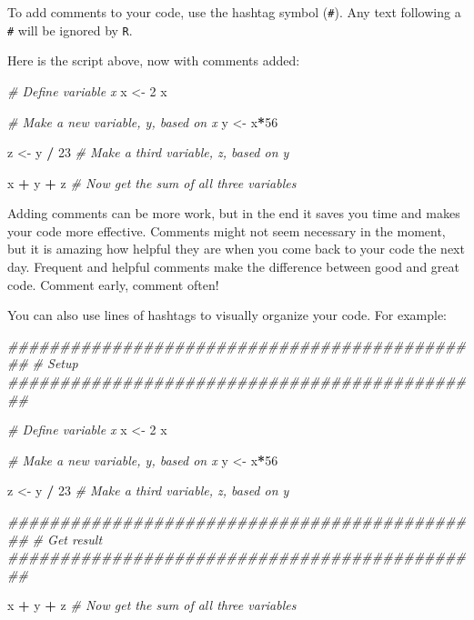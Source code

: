 \documentclass[
]{book}
\newenvironment{Shaded}{\begin{snugshade}}{\end{snugshade}}
\newcommand{\CommentTok}[1]{\textcolor[rgb]{0.56,0.35,0.01}{\textit{#1}}}
\newcommand{\DecValTok}[1]{\textcolor[rgb]{0.00,0.00,0.81}{#1}}
\newcommand{\NormalTok}[1]{#1}
\newcommand{\OperatorTok}[1]{\textcolor[rgb]{0.81,0.36,0.00}{\textbf{#1}}}
\newcommand{\StringTok}[1]{\textcolor[rgb]{0.31,0.60,0.02}{#1}}
\begin{document}
To add comments to your code, use the hashtag symbol (\texttt{\#}). Any text following a \texttt{\#} will be ignored by \texttt{R}.

Here is the script above, now with comments added:

\begin{Shaded}
\begin{Highlighting}[]
\CommentTok{# Define variable x}
\NormalTok{x <-}\StringTok{ }\DecValTok{2} 
\NormalTok{x}

\CommentTok{# Make a new variable, y, based on x}
\NormalTok{y <-}\StringTok{ }\NormalTok{x}\OperatorTok{*}\DecValTok{56}

\NormalTok{z <-}\StringTok{ }\NormalTok{y }\OperatorTok{/}\StringTok{ }\DecValTok{23} \CommentTok{# Make a third variable, z, based on y}
 
\NormalTok{x }\OperatorTok{+}\StringTok{ }\NormalTok{y }\OperatorTok{+}\StringTok{ }\NormalTok{z }\CommentTok{# Now get the sum of all three variables}
\end{Highlighting}
\end{Shaded}

Adding comments can be more work, but in the end it saves you time and makes your code more effective. Comments might not seem necessary in the moment, but it is amazing how helpful they are when you come back to your code the next day. Frequent and helpful comments make the difference between good and great code. Comment early, comment often!

You can also use lines of hashtags to visually organize your code. For example:

\begin{Shaded}
\begin{Highlighting}[]
\CommentTok{##############################################}
\CommentTok{# Setup}
\CommentTok{##############################################}

\CommentTok{# Define variable x}
\NormalTok{x <-}\StringTok{ }\DecValTok{2} 
\NormalTok{x}

\CommentTok{# Make a new variable, y, based on x}
\NormalTok{y <-}\StringTok{ }\NormalTok{x}\OperatorTok{*}\DecValTok{56}

\NormalTok{z <-}\StringTok{ }\NormalTok{y }\OperatorTok{/}\StringTok{ }\DecValTok{23} \CommentTok{# Make a third variable, z, based on y}
 

\CommentTok{##############################################}
\CommentTok{# Get result}
\CommentTok{##############################################}

\NormalTok{x }\OperatorTok{+}\StringTok{ }\NormalTok{y }\OperatorTok{+}\StringTok{ }\NormalTok{z }\CommentTok{# Now get the sum of all three variables}
\end{Highlighting}
\end{Shaded}
\end{document}
